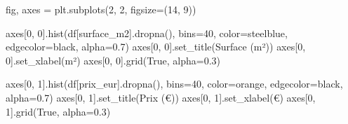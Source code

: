 \documentclass[
  french,
  11pt,
  a4paper,
]{scrbook}
\newenvironment{Shaded}{}{}
\newcommand{\DecValTok}[1]{\textcolor[rgb]{0.00,0.36,0.77}{#1}}
\newcommand{\FloatTok}[1]{\textcolor[rgb]{0.00,0.36,0.77}{#1}}
\newcommand{\NormalTok}[1]{\textcolor[rgb]{0.14,0.16,0.18}{#1}}
\newcommand{\OperatorTok}[1]{\textcolor[rgb]{0.14,0.16,0.18}{#1}}
\newcommand{\StringTok}[1]{\textcolor[rgb]{0.01,0.18,0.38}{#1}}
\newcommand{\VariableTok}[1]{\textcolor[rgb]{0.89,0.38,0.04}{#1}}
\begin{document}
\begin{tcolorbox}[enhanced jigsaw, arc=.35mm, bottomrule=.15mm, bottomtitle=1mm, breakable, colback=white, colbacktitle=quarto-callout-tip-color!10!white, colframe=quarto-callout-tip-color-frame, coltitle=black, left=2mm, leftrule=.75mm, opacityback=0, opacitybacktitle=0.6, rightrule=.15mm, title=\textcolor{quarto-callout-tip-color}{\faLightbulb}\hspace{0.5em}{✅ Corrigé Étape 1.2}, titlerule=0mm, toprule=.15mm, toptitle=1mm]

\begin{Shaded}
\begin{Highlighting}[]
\NormalTok{fig, axes }\OperatorTok{=}\NormalTok{ plt.subplots(}\DecValTok{2}\NormalTok{, }\DecValTok{2}\NormalTok{, figsize}\OperatorTok{=}\NormalTok{(}\DecValTok{14}\NormalTok{, }\DecValTok{9}\NormalTok{))}

\NormalTok{axes[}\DecValTok{0}\NormalTok{, }\DecValTok{0}\NormalTok{].hist(df[}\StringTok{\textquotesingle{}surface\_m2\textquotesingle{}}\NormalTok{].dropna(), bins}\OperatorTok{=}\DecValTok{40}\NormalTok{, color}\OperatorTok{=}\StringTok{\textquotesingle{}steelblue\textquotesingle{}}\NormalTok{, edgecolor}\OperatorTok{=}\StringTok{\textquotesingle{}black\textquotesingle{}}\NormalTok{, alpha}\OperatorTok{=}\FloatTok{0.7}\NormalTok{)}
\NormalTok{axes[}\DecValTok{0}\NormalTok{, }\DecValTok{0}\NormalTok{].set\_title(}\StringTok{\textquotesingle{}Surface (m²)\textquotesingle{}}\NormalTok{)}
\NormalTok{axes[}\DecValTok{0}\NormalTok{, }\DecValTok{0}\NormalTok{].set\_xlabel(}\StringTok{\textquotesingle{}m²\textquotesingle{}}\NormalTok{)}
\NormalTok{axes[}\DecValTok{0}\NormalTok{, }\DecValTok{0}\NormalTok{].grid(}\VariableTok{True}\NormalTok{, alpha}\OperatorTok{=}\FloatTok{0.3}\NormalTok{)}

\NormalTok{axes[}\DecValTok{0}\NormalTok{, }\DecValTok{1}\NormalTok{].hist(df[}\StringTok{\textquotesingle{}prix\_eur\textquotesingle{}}\NormalTok{].dropna(), bins}\OperatorTok{=}\DecValTok{40}\NormalTok{, color}\OperatorTok{=}\StringTok{\textquotesingle{}orange\textquotesingle{}}\NormalTok{, edgecolor}\OperatorTok{=}\StringTok{\textquotesingle{}black\textquotesingle{}}\NormalTok{, alpha}\OperatorTok{=}\FloatTok{0.7}\NormalTok{)}
\NormalTok{axes[}\DecValTok{0}\NormalTok{, }\DecValTok{1}\NormalTok{].set\_title(}\StringTok{\textquotesingle{}Prix (€)\textquotesingle{}}\NormalTok{)}
\NormalTok{axes[}\DecValTok{0}\NormalTok{, }\DecValTok{1}\NormalTok{].set\_xlabel(}\StringTok{\textquotesingle{}€\textquotesingle{}}\NormalTok{)}
\NormalTok{axes[}\DecValTok{0}\NormalTok{, }\DecValTok{1}\NormalTok{].grid(}\VariableTok{True}\NormalTok{, alpha}\OperatorTok{=}\FloatTok{0.3}\NormalTok{)}


\end{Highlighting}
\end{Shaded}
\end{tcolorbox}
\end{document}
